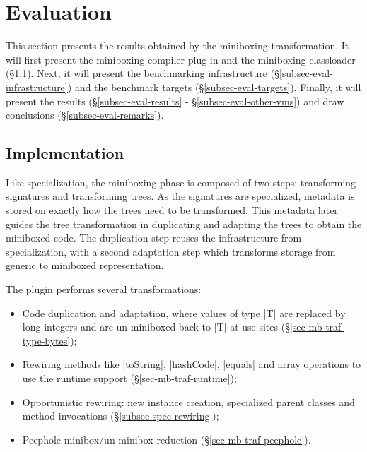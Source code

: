 \section{Evaluation}
\label{sec-evaluation}

\newcommand{\sctx}[0]{Single Context}
\newcommand{\mctx}[0]{Multi Context}
\newcommand{\bn}[1]{\textbf{#1}}
\newcommand{\opt}[1]{#1}

This section presents the results obtained by the miniboxing transformation. It will first present the miniboxing compiler plug-in and the miniboxing classloader (\S\ref{subsec-eval-impl}). Next, it will present the benchmarking infrastructure (\S\ref{subsec-eval-infrastructure}) and the benchmark targets (\S\ref{subsec-eval-targets}). Finally, it will present the results (\S\ref{subsec-eval-results} - \S\ref{subsec-eval-other-vms}) and draw conclusions (\S\ref{subsec-eval-remarks}).

\subsection{Implementation}
\label{subsec-eval-impl}

 Like specialization, the miniboxing phase is composed of two steps: transforming signatures and transforming trees. As the signatures are specialized, metadata is stored on exactly how the trees need to be transformed. This metadata later guides the tree transformation in duplicating and adapting the trees to obtain the miniboxed code. The duplication step reuses the infrastructure from specialization, with a second adaptation step which transforms storage from generic to miniboxed representation.   

The plugin performs several transformations:
\begin{itemize}
\item Code duplication and adaptation, where values of type |T| are replaced by long integers and are un-miniboxed back to |T| at use sites (\S\ref{sec-mb-traf-type-bytes});
\item Rewiring methods like |toString|, |hashCode|, |equals| and array operations to use the runtime support (\S\ref{sec-mb-traf-runtime});
\item Opportunistic rewiring: new instance creation, specialized parent classes and method invocations (\S\ref{subsec-spec-rewiring});
\item Peephole minibox/un-minibox reduction (\S\ref{sec-mb-traf-peephole}).
\end{itemize}
 
